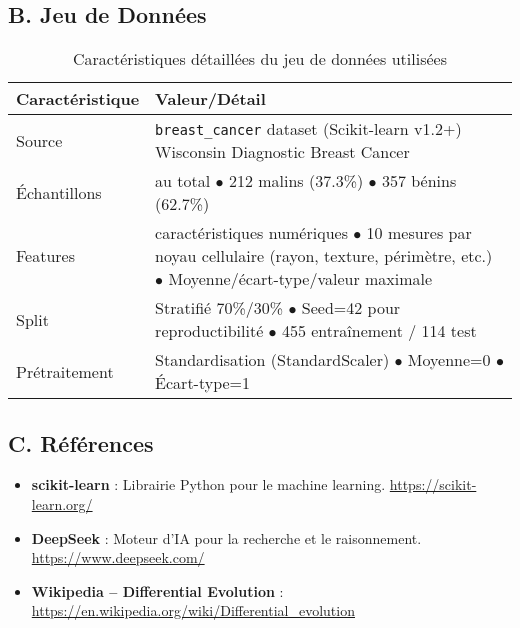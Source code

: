 \documentclass[a4paper, 12pt]{article}
\begin{document}
\subsection*{B. Jeu de Données}
\begin{table}[H]
\centering
\begin{tabular}{@{}l>{\raggedright\arraybackslash}p{8cm}@{}}
\toprule
\textbf{Caractéristique} & \textbf{Valeur/Détail} \\
\midrule
Source & \texttt{breast\_cancer} dataset (Scikit-learn v1.2+) \newline Wisconsin Diagnostic Breast Cancer \\

Échantillons & 569 au total \newline $\bullet$ 212 malins (37.3\%) \newline $\bullet$ 357 bénins (62.7\%) \\
Features & 30 caractéristiques numériques \newline $\bullet$ 10 mesures par noyau cellulaire (rayon, texture, périmètre, etc.) \newline $\bullet$ Moyenne/écart-type/valeur maximale \\
Split & Stratifié 70\%/30\% \newline $\bullet$ Seed=42 pour reproductibilité \newline $\bullet$ 455 entraînement / 114 test \\
Prétraitement & Standardisation (StandardScaler) \newline $\bullet$ Moyenne=0 \newline $\bullet$ Écart-type=1 \\
\bottomrule
\end{tabular}
\caption{Caractéristiques détaillées du jeu de données utilisées}
\label{tab:dataset_specs}
\end{table}
\subsection*{C. Références}  
\begin{itemize}  
\item \textbf{scikit-learn} : Librairie Python pour le machine learning. \href{https://scikit-learn.org/}{https://scikit-learn.org/}

    \item \textbf{DeepSeek} : Moteur d'IA pour la recherche et le raisonnement. \href{https://www.deepseek.com/}{https://www.deepseek.com/}

    \item \textbf{Wikipedia – Differential Evolution} : \href{https://en.wikipedia.org/wiki/Differential_evolution}{https://en.wikipedia.org/wiki/Differential\_evolution}
\end{itemize}  
\end{document}
